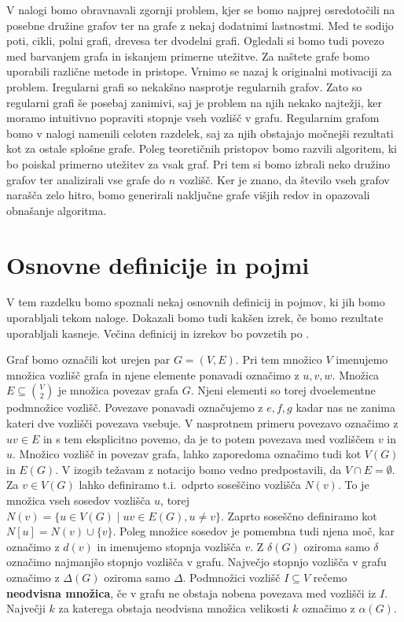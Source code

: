 \documentclass[12pt,a4paper,twoside]{article}
\theoremstyle{definition} %
\theoremstyle{plain} %
\numberwithin{equation}{section}  %
\begin{document}
V nalogi bomo obravnavali zgornji problem, kjer se bomo najprej osredotočili na posebne družine grafov ter na grafe z nekaj dodatnimi lastnostmi. Med te sodijo poti, cikli, polni grafi, drevesa ter dvodelni grafi. Ogledali si bomo tudi povezo med barvanjem grafa in iskanjem primerne utežitve. Za naštete grafe bomo uporabili različne metode in pristope. Vrnimo se nazaj k originalni motivaciji za problem. Iregularni grafi so nekakšno nasprotje regularnih grafov. Zato so regularni grafi še posebaj zanimivi, saj je problem na njih nekako najtežji, ker moramo intuitivno popraviti stopnje vseh vozlišč v grafu. Regularnim grafom bomo v nalogi namenili celoten razdelek, saj za njih obstajajo močnejši rezultati kot za ostale splošne grafe. Poleg teoretičnih pristopov bomo razvili algoritem, ki bo poiskal primerno utežitev za vsak graf. Pri tem si bomo izbrali neko družino grafov ter analizirali vse grafe do $n$ vozlišč. Ker je znano, da število vseh grafov narašča zelo hitro, bomo generirali naključne grafe višjih redov in opazovali obnašanje algoritma.



\section{Osnovne definicije in pojmi}

V tem razdelku bomo spoznali nekaj osnovnih definicij in pojmov, ki jih bomo uporabljali tekom naloge. Dokazali bomo tudi kakšen izrek, če bomo rezultate uporabljali kasneje. Večina definicij in izrekov bo povzetih po \cite{maingraph}.

Graf bomo označili kot urejen par $G=(V, E)$. Pri tem množico $V$ imenujemo množica vozlišč grafa in njene elemente ponavadi označimo z $u, v, w$. Množica $E \subseteq {V \choose 2} $ je množica povezav grafa $G$. Njeni elementi so torej dvoelementne podmnožice vozlišč. Povezave ponavadi označujemo z $e, f, g$ kadar nas ne zanima kateri dve vozlišči povezava vsebuje. V nasprotnem primeru povezavo označimo z $uv \in E$ in s tem eksplicitno povemo, da je to potem povezava med vozliščem $v$ in $u$. Množico vozlišč in povezav grafa, lahko zaporedoma označimo tudi kot $V(G)$ in $E(G)$. V izogib težavam z notacijo bomo vedno predpostavili, da $V \cap E = \emptyset$. 
Za $v \in V(G)$ lahko definiramo t.i.\ odprto soseščino vozlišča $N(v)$. To je množica vseh sosedov vozlišča $u$, torej $N(v) = \{u \in V(G) \mid uv \in E(G), u \neq v \}$. Zaprto soseščno definiramo kot $N\left[u\right] = N(v) \cup \{v\}$. Poleg množice sosedov je pomembna tudi njena moč, kar označimo z $d(v)$ in imenujemo stopnja vozlišča $v$. Z $\delta(G)$ oziroma samo $\delta$ označimo najmanjšo stopnjo vozlišča v grafu. Največjo stopnjo vozlišča v grafu označimo z $\Delta(G)$ oziroma samo $\Delta$. Podmnožici vozlišč $I \subseteq V$ rečemo \textbf{neodvisna množica}, če v grafu ne obstaja nobena povezava med vozlišči iz $I$. Največji $k$ za katerega obstaja neodvisna množica velikosti $k$ označimo z $\alpha(G)$.
\end{document}
